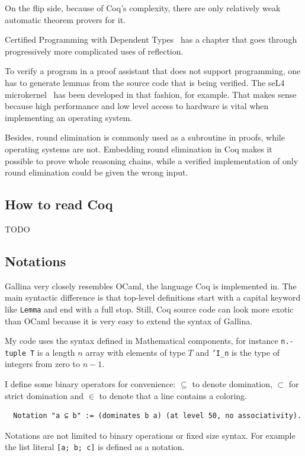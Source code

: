 \documentclass[english, 12pt, a4paper, sci, a-1b, online]{aaltothesis}
\newcommand\icoq[1]{\texttt{#1}}
\begin{document}
On the flip side, because of Coq's complexity, there are only relatively weak automatic theorem provers for it.

Certified Programming with Dependent Types~\cite{CPDT} has a chapter that goes through progressively more complicated uses of reflection.

To verify a program in a proof assistant that does not support programming, one has to generate lemmas from the source code that is being verified. The seL4 microkernel~\cite{sel4} has been developed in that fashion, for example. That makes sense because high performance and low level access to hardware is vital when implementing an operating system.

Besides, round elimination is commonly used as a subroutine in proofs, while operating systems are not. Embedding round elimination in Coq makes it possible to prove whole reasoning chains, while a verified implementation of only round elimination could be given the wrong input.

\subsection{How to read Coq}

TODO

\subsection{Notations}

Gallina very closely resembles OCaml, the language Coq is implemented in. The main syntactic difference is that top-level definitions start with a capital keyword like \icoq{Lemma} and end with a full stop. Still, Coq source code can look more exotic than OCaml because it is very easy to extend the syntax of Gallina.

My code uses the syntax defined in Mathematical components, for instance \icoq{n.-tuple T} is a length $n$ array with elements of type $T$ and \icoq{'I_n} is the type of integers from zero to $n-1$.

I define some binary operators for convenience: $\subseteq$ to denote domination, $\subset$ for strict domination and $\in$ to denote that a line contains a coloring.
\begin{verbatim}
  Notation "a ⊆ b" := (dominates b a) (at level 50, no associativity).
\end{verbatim}

Notations are not limited to binary operations or fixed size syntax. For example the list literal \icoq{[a; b; c]} is defined as a notation.
\end{document}
